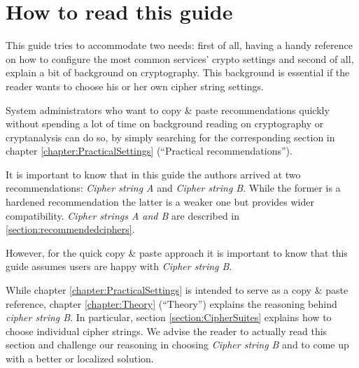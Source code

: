 \section{How to read this guide}
\label{sec:how-read-this}
This guide tries to accommodate two needs: first of all, having a handy reference on how to configure the most common services' crypto settings and second of all, explain a bit of background on cryptography. This background is essential if the reader wants to choose his or her own cipher string settings.

System administrators who want to copy \& paste recommendations quickly without
spending a lot of time on background reading on cryptography or cryptanalysis
can do so, by simply searching for the corresponding section in chapter
\ref{chapter:PracticalSettings} (``Practical recommendations'').

It is important to know that in this guide the authors arrived at two recommendations: \textit{Cipher string A} and \textit{Cipher string B}. While the former is a hardened recommendation the latter is a weaker one but provides wider compatibility.
\textit{Cipher strings A and B} are described in \ref{section:recommendedciphers}.


However, for the quick copy \& paste approach it is important to know that this
guide assumes users are happy with \textit{Cipher string B}.


While chapter \ref{chapter:PracticalSettings} is intended to serve as a copy \& paste reference, chapter \ref{chapter:Theory} (``Theory'') explains the reasoning behind \textit{cipher string B}. In particular, section \ref{section:CipherSuites} explains how to choose individual cipher strings. We advise the reader to actually read this section and challenge our reasoning in choosing \textit{Cipher string B} and to come up with a better  or localized solution.


